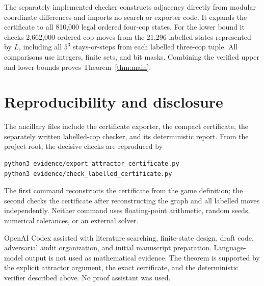 \documentclass[11pt]{article}
\begin{document}
The separately implemented checker constructs adjacency directly from
modular coordinate differences and imports no search or exporter code.  It
expands the certificate to all 810,000 legal ordered four-cop states.  For the
lower bound it checks 2,662,000 ordered cop moves from the 21,296 labelled
states represented by $L$, including all $5^3$ stays-or-steps from each
labelled three-cop tuple.  All comparisons use integers, finite sets, and bit
masks.  Combining the verified upper and lower bounds proves
Theorem~\ref{thm:main}.

\section{Reproducibility and disclosure}

The ancillary files include the certificate exporter, the compact certificate,
the separately written labelled-cop checker, and its deterministic report.
From the project root, the decisive checks are reproduced by
\begin{verbatim}
python3 evidence/export_attractor_certificate.py
python3 evidence/check_labelled_certificate.py
\end{verbatim}
The first command reconstructs the certificate from the game definition; the
second checks the certificate after reconstructing the graph and all labelled
moves independently.  Neither command uses floating-point arithmetic, random
seeds, numerical tolerances, or an external solver.

OpenAI Codex assisted with literature searching, finite-state design, draft
code, adversarial audit organization, and initial manuscript preparation.
Language-model output is not used as mathematical evidence.  The theorem is
supported by the explicit attractor argument, the exact certificate, and the
deterministic verifier described above.  No proof assistant was used.



\end{document}
